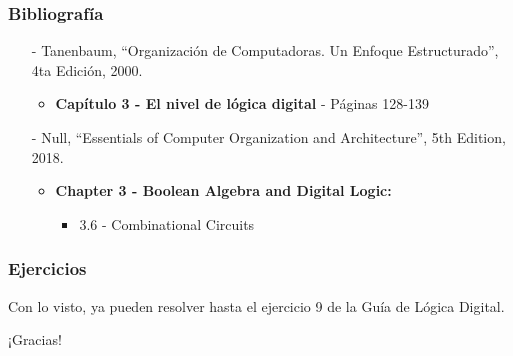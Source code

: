 \documentclass[aspectratio=169]{beamer}
\begin{document}
\begin{frame}[fragile]
    \frametitle{Bibliografía}
    \begin{itemize}
     \setlength\itemsep{0.5cm}
    \item[-] \small Tanenbaum, “Organización de Computadoras. Un Enfoque Estructurado”, 4ta Edición, 2000.\\
    \begin{itemize}
     \item \textbf{Capítulo 3 - El nivel de lógica digital} - Páginas 128-139
    \end{itemize}
    \item[-] \small Null, “Essentials of Computer Organization and Architecture”, 5th Edition, 2018.\\
    \begin{itemize}
     \item \textbf{Chapter 3 - Boolean Algebra and Digital Logic:}
     \begin{itemize}
     \item 3.6 - Combinational Circuits
     \end{itemize}
    \end{itemize}
    \end{itemize}
\end{frame}

\begin{frame}[fragile]
    \frametitle{Ejercicios}
    Con lo visto, ya pueden resolver hasta el ejercicio 9 de la Guía de Lógica Digital.
\end{frame}

\begin{frame}[plain]
    \begin{center}
    \vspace{2cm}
    \huge ¡Gracias!\\
    \vspace{2cm}
    \end{center}
\end{frame}
\end{document}
